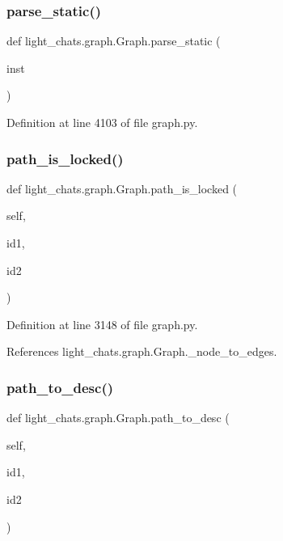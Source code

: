 \subsubsection{\texorpdfstring{parse\+\_\+static()}{parse\_static()}}
{\footnotesize\ttfamily def light\+\_\+chats.\+graph.\+Graph.\+parse\+\_\+static (\begin{DoxyParamCaption}\item[{}]{inst }\end{DoxyParamCaption})\hspace{0.3cm}{\ttfamily [static]}}



Definition at line 4103 of file graph.\+py.

\mbox{\label{classlight__chats_1_1graph_1_1Graph_aeeb122366f2f098d889309fa53d19917}} 
\subsubsection{\texorpdfstring{path\+\_\+is\+\_\+locked()}{path\_is\_locked()}}
{\footnotesize\ttfamily def light\+\_\+chats.\+graph.\+Graph.\+path\+\_\+is\+\_\+locked (\begin{DoxyParamCaption}\item[{}]{self,  }\item[{}]{id1,  }\item[{}]{id2 }\end{DoxyParamCaption})}



Definition at line 3148 of file graph.\+py.



References light\+\_\+chats.\+graph.\+Graph.\+\_\+node\+\_\+to\+\_\+edges.

\mbox{\label{classlight__chats_1_1graph_1_1Graph_afd47e9b4f058dc2cbb520164db920664}} 
\subsubsection{\texorpdfstring{path\+\_\+to\+\_\+desc()}{path\_to\_desc()}}
{\footnotesize\ttfamily def light\+\_\+chats.\+graph.\+Graph.\+path\+\_\+to\+\_\+desc (\begin{DoxyParamCaption}\item[{}]{self,  }\item[{}]{id1,  }\item[{}]{id2 }\end{DoxyParamCaption})}

